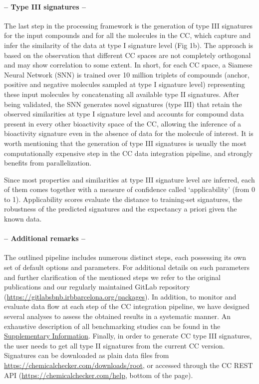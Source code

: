 \paragraph{-- Type III signatures --} \leavevmode


The last step in the processing framework is the generation of type III signatures for the input compounds and for all the molecules in the CC, which capture and infer the similarity of the data at type I signature level (Fig 1b). The approach is based on the observation that different CC spaces are not completely orthogonal and may show correlation to some extent. In short, for each CC space, a Siamese Neural Network (SNN) is trained over 10 million triplets of compounds (anchor, positive and negative molecules sampled at type I signature level) representing these input molecules by concatenating all available type II signatures. After being validated, the SNN generates novel signatures (type III) that retain the observed similarities at type I signature level and accounts for compound data present in every other bioactivity space of the CC, allowing the inference of a bioactivity signature even in the absence of data for the molecule of interest. It is worth mentioning that the generation of type III signatures is usually the most computationally expensive step in the CC data integration pipeline, and strongly benefits from parallelization.

Since most properties and similarities at type III signature level are inferred, each of them comes together with a measure of confidence called ‘applicability’ (from 0 to 1). Applicability scores evaluate the distance to training-set signatures, the robustness of the predicted signatures and the expectancy a priori given the known data. 

\paragraph{-- Additional remarks --} \leavevmode


The outlined pipeline includes numerous distinct steps, each possessing its own set of default options and parameters. For additional details on such parameters and further clarification of the mentioned steps we refer to the original publications\cite{duran-frigola_extending_2020, bertoni_bioactivity_2021} and our regularly maintained GitLab repository (\href{https://gitlabsbnb.irbbarcelona.org/packages}{https://gitlabsbnb.irbbarcelona.org/packages}). In addition, to monitor and evaluate data flow at each step of the CC integration pipeline, we have designed several analyses to assess the obtained results in a systematic manner. An exhaustive description of all benchmarking studies can be found in the \hyperref[Protocols_SupplementaryInformation]{Supplementary Information}. Finally, in order to generate CC type III signatures, the user needs to get all type II signatures from the current CC version. Signatures can be downloaded as plain data files from \href{https://chemicalchecker.com/downloads/root}{https://chemicalchecker.com/downloads/root}, or accessed through the CC REST API (\href{https://chemicalchecker.com/help}{https://chemicalchecker.com/help}, bottom of the page).


